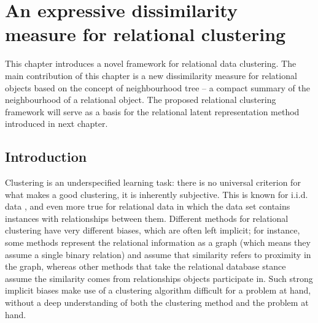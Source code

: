 \chapter{An expressive dissimilarity measure for relational clustering}\label{ch:clustering}


This chapter introduces a novel framework for relational data clustering. 
The main contribution of this chapter is a new dissimilarity measure for relational objects based on the concept of neighbourhood tree -- a compact summary of the neighbourhood of a relational object.
The proposed relational clustering framework will serve as a basis for the relational latent representation method introduced in next chapter.




\section{Introduction}




Clustering is an underspecified learning task: there is no universal criterion for what makes a good clustering, it is inherently subjective.  
This is known for i.i.d. data \cite{Estivill-Castro:2002}, and even more true for relational data in which the data set contains instances with relationships between them.  
Different methods for relational clustering have very different biases, which are often left implicit; for instance, some methods represent the relational information as a graph (which means they assume a single binary relation) and assume that similarity refers to proximity in the graph, whereas other methods that take the relational database stance assume the similarity comes from relationships objects participate in.
Such strong implicit biases make use of a clustering algorithm difficult for a problem at hand, without a deep understanding of both the clustering method and the problem at hand.

